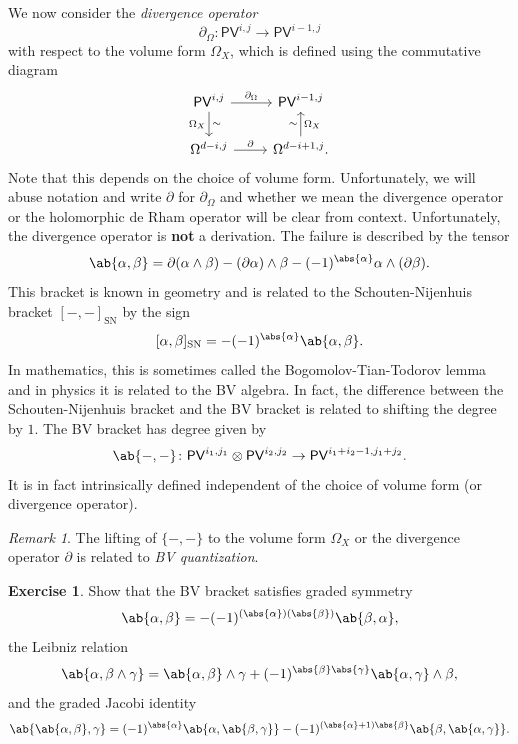 \documentclass{amsart}
\theoremstyle{definition}
\newtheorem{exer}[thm]{Exercise}
\theoremstyle{remark}
\newtheorem{rmk}[thm]{Remark}
\theoremstyle{plain}
\theoremstyle{definition}
\theoremstyle{remark}
\newcommand{\mr}[1]{\mathrm{#1}}
\newcommand{\ms}[1]{\mathsf{#1}}
\newcommand{\1}{\mathbf{1}}
\newcommand{\2}{\mathbf{2}}
\newcommand{\3}{\mathbf{3}}
\begin{document}
We now consider the \textit{divergence operator}
\[ \partial_{\Omega} \colon \ms{PV}^{i,j} \to \ms{PV}^{i-1, j} \]
with respect to the volume form \(\Omega_X\), which is defined using the commutative diagram
\begin{equation*}
\begin{tikzcd}
    \ms{PV}^{i,j} \ar{d}{\sim}[swap]{\Omega_X} \ar{r}{\partial_{\Omega}} & \ms{PV}^{i-1, j} \\
    \Omega^{d-i,j} \ar{r}{\partial} & \Omega^{d-i+1, j} \ar{u}{\sim}[swap]{\Omega_X}.
\end{tikzcd}
\end{equation*}
Note that this depends on the choice of volume form. Unfortunately, we will abuse notation and write \(\partial\) for \(\partial_{\Omega}\) and whether we mean the divergence operator or the holomorphic de Rham operator will be clear from context. Unfortunately, the divergence operator is \textbf{not} a derivation. The failure is described by the tensor
\[ \ab\{\alpha, \beta \} = \partial(\alpha \wedge \beta) - (\partial \alpha) \wedge \beta - (-1)^{\abs{\alpha}} \alpha \wedge (\partial \beta). \]
This bracket is known in geometry and is related to the Schouten-Nijenhuis bracket \([-,-]_{\mr{SN}}\) by the sign
\[ [\alpha, \beta]_{\mr{SN}} = -(-1)^{\abs{\alpha}} \ab\{\alpha, \beta \}. \]
In mathematics, this is sometimes called the Bogomolov-Tian-Todorov lemma and in physics it is related to the BV algebra. In fact, the difference between the Schouten-Nijenhuis bracket and the BV bracket is related to shifting the degree by \(1\). The BV bracket has degree given by
\[ \ab\{-,-\} \colon \ms{PV}^{i_1, j_1} \otimes \ms{PV}^{i_2, j_2} \to \ms{PV}^{i_1 + i_2 - 1, j_1 + j_2}. \]
It is in fact intrinsically defined independent of the choice of volume form (or divergence operator). 

\begin{rmk}
    The lifting of \(\{-,-\}\) to the volume form \(\Omega_X\) or the divergence operator \(\partial\) is related to \textit{BV quantization}.
\end{rmk}

\begin{exer}
    Show that the BV bracket satisfies
    graded symmetry 
    \[\ab\{\alpha, \beta\} = -(-1)^{(\abs{\alpha})(\abs{\beta})} \ab\{\beta, \alpha\}, \]
    the Leibniz relation
    \[  \ab\{\alpha, \beta \wedge \gamma\} = \ab\{\alpha, \beta\} \wedge \gamma + (-1)^{\abs{\beta} \abs{\gamma}} \ab\{\alpha, \gamma\} \wedge \beta, \]
    and the graded Jacobi identity 
    \[ \ab\{ \ab\{ \alpha, \beta \}, \gamma\} = (-1)^{\abs{\alpha}} \ab\{\alpha, \ab\{\beta, \gamma\}\} - (-1)^{(\abs{\alpha}+1)\abs{\beta}} \ab\{\beta, \ab\{\alpha, \gamma\}\}. \]
\end{exer}
\end{document}
